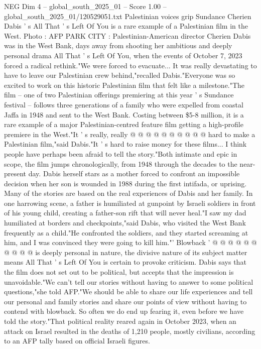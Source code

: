 \begin{textsample}{NEG Dim 4 – global\_south\_2025\_01 – Score 1.00 – global\_south\_2025\_01/120529051.txt}  \label{ex:f4_neg_441}
Palestinian voices grip Sundance Cherien Dabis ' s All That ' s Left Of You is a rare example of a Palestinian film in the West.
Photo : AFP PARK CITY : Palestinian-American director Cherien Dabis was in the West Bank, days away from shooting her ambitious and deeply personal drama All That ' s Left Of You, when the events of October 7, 2023 forced a radical rethink."We were forced to evacuate...
It was really devastating to have to leave our Palestinian crew behind,"recalled Dabis."Everyone was so excited to work on this historic Palestinian film that felt like a milestone."The film -- one of two Palestinian offerings premiering at this year ' s Sundance festival -- follows three generations of a family who were expelled from coastal Jaffa in 1948 and sent to the West Bank.
Costing between \$5-8 million, it is a rare example of a major Palestinian-centred feature film getting a high-profile premiere in the West."It ' s really, really @ @ @ @ @ @ @ @ @ @ hard to make a Palestinian film,"said Dabis."It ' s hard to raise money for these films...
I think people have perhaps been afraid to tell the story."Both intimate and epic in scope, the film jumps chronologically, from 1948 through the decades to the near-present day.
Dabis herself stars as a mother forced to confront an impossible decision when her son is wounded in 1988 during the first intifada, or uprising.
Many of the stories are based on the real experiences of Dabis and her family.
In one harrowing scene, a father is humiliated at gunpoint by Israeli soldiers in front of his young child, creating a father-son rift that will never heal."I saw my dad humiliated at borders and checkpoints,"said Dabis, who visited the West Bank frequently as a child."He confronted the soldiers, and they started screaming at him, and I was convinced they were going to kill him."' Blowback ' @ @ @ @ @ @ @ @ @ @ is deeply personal in nature, the divisive nature of its subject matter means All That ' s Left Of You is certain to provoke criticism.
Dabis says that the film does not set out to be political, but accepts that the impression is unavoidable."We can't tell our stories without having to answer to some political questions,"she told AFP."We should be able to share our life experiences and tell our personal and family stories and share our points of view without having to contend with blowback.
So often we do end up fearing it, even before we have told the story."That political reality reared again in October 2023, when an attack on Israel resulted in the deaths of 1,210 people, mostly civilians, according to an AFP tally based on official Israeli figures.

\end{textsample}
